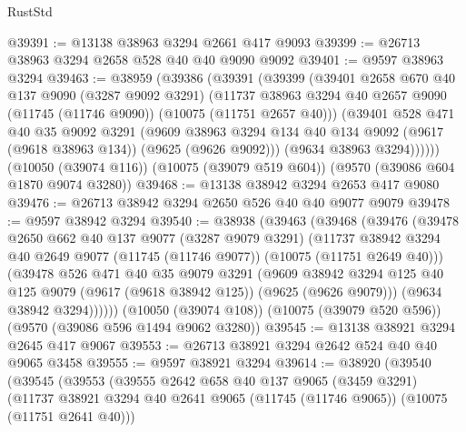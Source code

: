 \begin{lexlean}{RustStd}
\begin{coremodule}
@39391 := @13138 @38963 @3294 @2661 @417 @9093
@39399 := @26713 @38963 @3294 @2658 @528 @40 @40 @9090 @9092
@39401 := @9597 @38963 @3294
@39463 := @38959
    (@39386
      (@39391
        (@39399
          (@39401
            @2658
            @670
            @40
            @137
            @9090
            (@3287 @9092 @3291)
            (@11737
              @38963
              @3294
              @40
              @2657
              @9090
              (@11745 (@11746 @9090))
              (@10075 (@11751 @2657 @40)))
            (@39401
              @528
              @471
              @40
              @35
              @9092
              @3291
              (@9609
                @38963
                @3294
                @134
                @40
                @134
                @9092
                (@9617 (@9618 @38963 @134))
                (@9625 (@9626 @9092)))
              (@9634 @38963 @3294))))))
    (@10050 (@39074 @116))
    (@10075 (@39079 @519 @604))
    (@9570 (@39086 @604 @1870 @9074 @3280))
@39468 := @13138 @38942 @3294 @2653 @417 @9080
@39476 := @26713 @38942 @3294 @2650 @526 @40 @40 @9077 @9079
@39478 := @9597 @38942 @3294
@39540 := @38938
    (@39463
      (@39468
        (@39476
          (@39478
            @2650
            @662
            @40
            @137
            @9077
            (@3287 @9079 @3291)
            (@11737
              @38942
              @3294
              @40
              @2649
              @9077
              (@11745 (@11746 @9077))
              (@10075 (@11751 @2649 @40)))
            (@39478
              @526
              @471
              @40
              @35
              @9079
              @3291
              (@9609
                @38942
                @3294
                @125
                @40
                @125
                @9079
                (@9617 (@9618 @38942 @125))
                (@9625 (@9626 @9079)))
              (@9634 @38942 @3294))))))
    (@10050 (@39074 @108))
    (@10075 (@39079 @520 @596))
    (@9570 (@39086 @596 @1494 @9062 @3280))
@39545 := @13138 @38921 @3294 @2645 @417 @9067
@39553 := @26713 @38921 @3294 @2642 @524 @40 @40 @9065 @3458
@39555 := @9597 @38921 @3294
@39614 := @38920
    (@39540
      (@39545
        (@39553
          (@39555
            @2642
            @658
            @40
            @137
            @9065
            (@3459 @3291)
            (@11737
              @38921
              @3294
              @40
              @2641
              @9065
              (@11745 (@11746 @9065))
              (@10075 (@11751 @2641 @40)))

\end{coremodule}
\end{lexlean}
